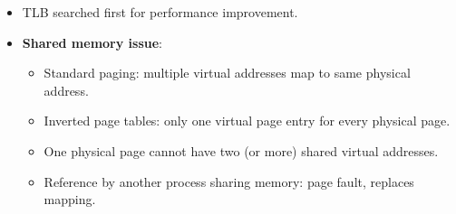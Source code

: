 \begin{itemize}
    \item TLB searched first for performance improvement.
    \item \textbf{Shared memory issue}:
    \begin{itemize}
        \item Standard paging: multiple virtual addresses map to same physical address.
        \item Inverted page tables: only one virtual page entry for every physical page.
        \item One physical page cannot have two (or more) shared virtual addresses.
        \item Reference by another process sharing memory: page fault, replaces mapping.
    \end{itemize}
\end{itemize}

